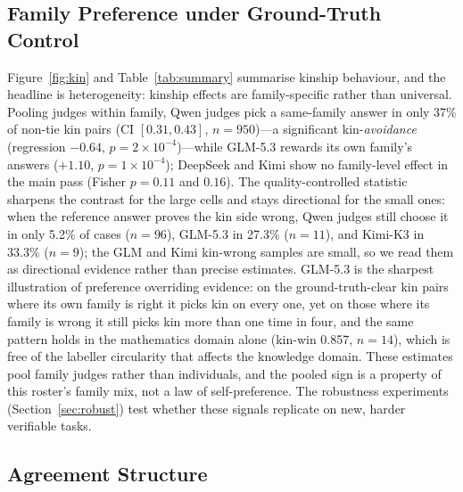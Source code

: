 \documentclass[review,12pt]{elsarticle}
\begin{document}
\subsection{Family Preference under Ground-Truth Control}
\label{sec:res-kin}

Figure~\ref{fig:kin} and Table~\ref{tab:summary} summarise kinship
behaviour, and the headline is heterogeneity: kinship effects are
family-specific rather than universal. Pooling judges within family, Qwen
judges pick a same-family answer in only 37\% of non-tie kin pairs (CI
$[0.31, 0.43]$, $n=950$)---a significant kin-\emph{avoidance} (regression
$-0.64$, $p=2\times10^{-4}$)---while GLM-5.3 rewards its own family's
answers ($+1.10$, $p=1\times10^{-4}$); DeepSeek and Kimi show no
family-level effect in the main pass (Fisher $p=0.11$ and $0.16$). The
quality-controlled statistic sharpens the contrast for the large cells and
stays directional for the small ones: when the reference answer proves the
kin side wrong, Qwen judges still choose it in only 5.2\% of cases
($n=96$), GLM-5.3 in 27.3\% ($n=11$), and Kimi-K3 in 33.3\% ($n=9$); the
GLM and Kimi kin-wrong samples are small, so we read them as directional
evidence rather than precise estimates. GLM-5.3 is the sharpest
illustration of preference overriding evidence: on the ground-truth-clear
kin pairs where its own family is right it picks kin on every one, yet on
those where its family is wrong it still picks kin more than one time in
four, and the same pattern holds in the mathematics domain alone (kin-win
0.857, $n=14$), which is free of the labeller circularity that affects the
knowledge domain. These estimates pool family judges rather than
individuals, and the pooled sign is a property of this roster's family mix,
not a law of self-preference. The robustness experiments
(Section~\ref{sec:robust}) test whether these signals replicate on new,
harder verifiable tasks.

\subsection{Agreement Structure}
\label{sec:res-agree}
\end{document}
